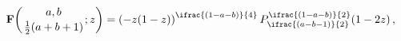 \[\mathop{\mathbf{F}\/}\nolimits\!\left({a,b\atop\tfrac{1}{2}(a+b+1)};z\right)=%
\left(-z(1-z)\right)^{\ifrac{(1-a-b)}{4}}\*\mathop{P^{\ifrac{(1-a-b)}{2}}_{%
\ifrac{(a-b-1)}{2}}\/}\nolimits\!\left(1-2z\right),\]